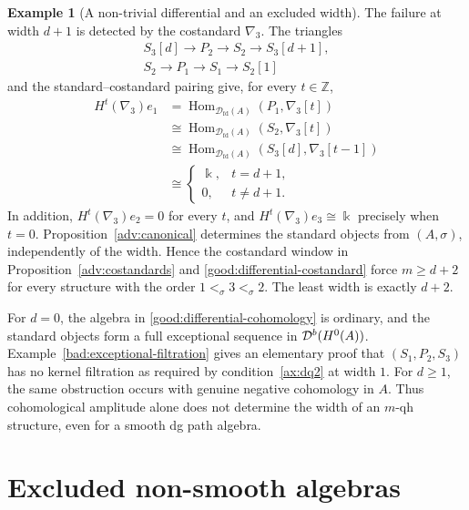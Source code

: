 \documentclass[11pt,a4paper]{article}
\newcommand{\D}{\mathcal D}
\newcommand{\ZZ}{\mathbb{Z}}
\newcommand{\costd}{\nabla}
\DeclareMathOperator{\fd}{fd}
\DeclareMathOperator{\Hom}{Hom}
\let\mod\relax
\DeclareMathOperator{\mod}{mod}
\theoremstyle{plain}
\theoremstyle{definition}
\newtheorem{example}[theorem]{Example}
\numberwithin{equation}{section}
\begin{document}
\begin{example}[A non-trivial differential and an excluded width]
The failure at width $d+1$ is detected by the costandard
$\costd_3$. The triangles
\begin{equation}\label{good:differential-triangles}
 \begin{gathered}
 S_3[d]\longrightarrow P_2\longrightarrow S_2
 \longrightarrow S_3[d+1],\\
 S_2\longrightarrow P_1\longrightarrow S_1\longrightarrow S_2[1]
 \end{gathered}
\end{equation}
and the standard--costandard pairing give, for every $t\in\ZZ$,
\begin{equation}\label{good:differential-costandard}
 \begin{aligned}
 H^t(\costd_3)e_1
 &=\Hom_{\D_{\fd}(A)}(P_1,\costd_3[t])\\
 &\cong\Hom_{\D_{\fd}(A)}(S_2,\costd_3[t])\\
 &\cong\Hom_{\D_{\fd}(A)}(S_3[d],\costd_3[t-1])\\
 &\cong
 \begin{cases}\Bbbk,&t=d+1,\\0,&t\neq d+1.
 \end{cases}
 \end{aligned}
\end{equation}
In addition, $H^t(\costd_3)e_2=0$ for every $t$, and
$H^t(\costd_3)e_3\cong\Bbbk$ precisely when $t=0$.
Proposition~\ref{adv:canonical} determines the standard objects
from $(A,\sigma)$, independently of the width.
Hence the costandard window in
Proposition~\ref{adv:costandards} and
\eqref{good:differential-costandard} force $m\geq d+2$ for every
structure with the order $1<_\sigma3<_\sigma2$.
The least width is exactly $d+2$.

For $d=0$, the algebra in \eqref{good:differential-cohomology} is
ordinary, and the standard objects form a full exceptional sequence
in $\D^b(\mod H^0(A))$. Example~\ref{bad:exceptional-filtration}
gives an elementary proof that $(S_1,P_2,S_3)$ has no kernel filtration
as required by condition~\ref{ax:dq2} at width $1$.
For $d\geq1$, the same obstruction occurs with genuine negative
cohomology in $A$. Thus cohomological amplitude alone does not
determine the width of an $m$-qh structure, even for a smooth dg
path algebra.
\end{example}

\section{Excluded non-smooth algebras}\label{bad:nonsmooth}
\end{document}
